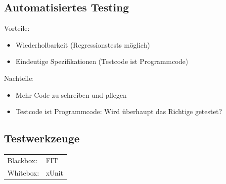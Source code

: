 \begin{multicols}{2}
\subsection{Automatisiertes Testing}
Vorteile:
	\begin{itemize}
		\item Wiederholbarkeit (Regressionstests möglich)
		\item Eindeutige Spezifikationen (Testcode ist Programmcode)
	\end{itemize}
	
Nachteile:
	\begin{itemize}
		\item Mehr Code zu schreiben und pflegen
		\item Testcode ist Programmcode: Wird überhaupt das Richtige getestet?
	\end{itemize}
	
\subsection{Testwerkzeuge}
\begin{tabular}{ll}
	Blackbox: & FIT \\
	Whitebox: & xUnit
\end{tabular}

\end{multicols}